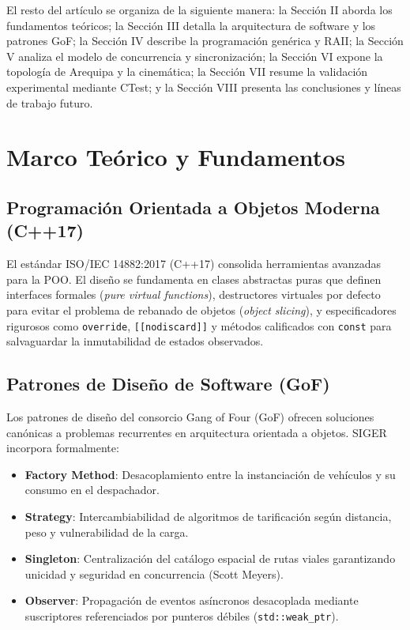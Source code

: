 \documentclass[conference]{IEEEtran}
\begin{document}
El resto del artículo se organiza de la siguiente manera: la Sección II aborda los fundamentos teóricos; la Sección III detalla la arquitectura de software y los patrones GoF; la Sección IV describe la programación genérica y RAII; la Sección V analiza el modelo de concurrencia y sincronización; la Sección VI expone la topología de Arequipa y la cinemática; la Sección VII resume la validación experimental mediante CTest; y la Sección VIII presenta las conclusiones y líneas de trabajo futuro.

\section{Marco Teórico y Fundamentos}

\subsection{Programación Orientada a Objetos Moderna (C++17)}
El estándar ISO/IEC 14882:2017 (C++17) consolida herramientas avanzadas para la POO. El diseño se fundamenta en clases abstractas puras que definen interfaces formales (\textit{pure virtual functions}), destructores virtuales por defecto para evitar el problema de rebanado de objetos (\textit{object slicing}), y especificadores rigurosos como \texttt{override}, \texttt{[[nodiscard]]} y métodos calificados con \texttt{const} para salvaguardar la inmutabilidad de estados observados.

\subsection{Patrones de Diseño de Software (GoF)}
Los patrones de diseño del consorcio Gang of Four (GoF) \cite{gamma1994design} ofrecen soluciones canónicas a problemas recurrentes en arquitectura orientada a objetos. SIGER incorpora formalmente:
\begin{itemize}
    \item \textbf{Factory Method}: Desacoplamiento entre la instanciación de vehículos y su consumo en el despachador.
    \item \textbf{Strategy}: Intercambiabilidad de algoritmos de tarificación según distancia, peso y vulnerabilidad de la carga.
    \item \textbf{Singleton}: Centralización del catálogo espacial de rutas viales garantizando unicidad y seguridad en concurrencia (Scott Meyers).
    \item \textbf{Observer}: Propagación de eventos asíncronos desacoplada mediante suscriptores referenciados por punteros débiles (\texttt{std::weak\_ptr}).
\end{itemize}
\end{document}
